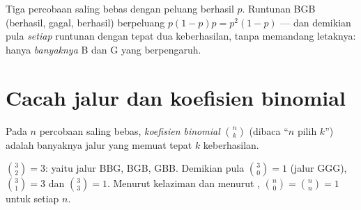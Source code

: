 \begin{example}\label{ex:g11:binom:threetrials}
Tiga percobaan saling bebas dengan peluang berhasil $p$. Runtunan BGB
(berhasil, gagal, berhasil) berpeluang $p(1-p)p = p^2(1-p)$ --- dan
demikian pula \emph{setiap} runtunan dengan tepat dua keberhasilan, tanpa
memandang letaknya: hanya \emph{banyaknya} B dan G yang berpengaruh.
\end{example}

\section{Cacah jalur dan koefisien binomial}

\begin{definition}\label{def:g11:binom:coefficient}
Pada  $n$ percobaan saling bebas, \emph{koefisien
binomial} $\binom{n}{k}$ (dibaca ``$n$
pilih $k$'') adalah banyaknya jalur yang memuat tepat $k$ keberhasilan.
\end{definition}

\begin{example}
$\binom{3}{2} = 3$: yaitu jalur BBG, BGB, GBB. Demikian pula $\binom{3}{0} = 1$
(jalur GGG), $\binom{3}{1} = 3$ dan $\binom{3}{3} = 1$. Menurut
kelaziman dan menurut , $\binom n0 = \binom nn = 1$ untuk setiap $n$.
\end{example}

